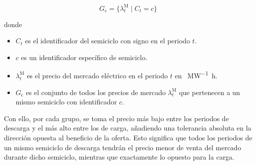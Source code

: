 \begin{samepage}

  \begin{equation}%
    \label{eq:agrupado-periodos}
    G_{\mathrm{c}} = \{ \lambda^{\mathrm{M}}_{t} \mid C_{t} = c \}
  \end{equation}

  donde

  \begin{itemize}

    \item \( C_{t} \) es el identificador del semiciclo con signo en el periodo \( t \).

    \item \( c \) es un identificador específico de semiciclo.

    \item \( \lambda^{\mathrm{M}}_{t} \) es el precio del mercado eléctrico en el periodo \( t \) en \si{\text{\euro}\per\mega\watt\hour}.

    \item \( G_{\mathrm{c}} \) es el conjunto de todos los precios de mercado \( \lambda^{\mathrm{M}}_{t} \) que pertenecen a un mismo semiciclo con identificador \( c \).

  \end{itemize}

\end{samepage}

Con ello, por cada grupo, se toma el precio más bajo entre los periodos de descarga y el más alto entre los de carga, añadiendo una tolerancia absoluta en la dirección opuesta al beneficio de la oferta. Esto significa que todos los periodos de un mismo semiciclo de descarga tendrán el precio menor de venta del mercado durante dicho semiciclo, mientras que exactamente lo opuesto para la carga.

